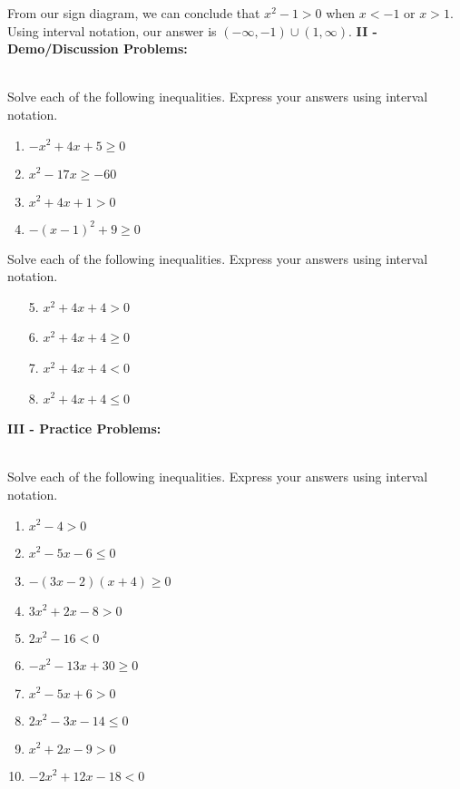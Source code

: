 \documentclass[12pt]{article}
\theoremstyle{definition}
\begin{document}
\begin{center}
\end{center} 
From our sign diagram, we can conclude that $x^2-1>0$ when $x<-1$ or $x>1$.  Using interval notation, our answer is $(-\infty,-1)\cup(1,\infty)$.\newpage
{\bf II - Demo/Discussion Problems:}\\
\ \par
Solve each of the following inequalities.  Express your answers using interval notation.
\begin{enumerate}
	\item $-x^2+4x+5\geq 0$
	\item $x^2-17x\geq -60$
	\item $x^2+4x+1>0$
	\item $-(x-1)^2+9\geq 0$
\end{enumerate}
Solve each of the following inequalities.  Express your answers using interval notation.
\begin{enumerate}
	\item[5.] $x^2+4x+4>0$
	\item[6.] $x^2+4x+4\geq 0$
	\item[7.] $x^2+4x+4<0$
	\item[8.] $x^2+4x+4\leq 0$
\end{enumerate}
{\bf III - Practice Problems:}\\
\ \par
Solve each of the following inequalities.  Express your answers using interval notation.
\begin{multicols}{2}
\begin{enumerate}
	\item $x^2-4>0$
	\item $x^2-5x-6\leq 0$
	\item $-(3x-2)(x+4)\geq 0$
	\item $3x^2+2x-8>0$
	\item $2x^2-16<0$
	\item $-x^2-13x+30\geq 0$
	\item $x^2-5x+6>0$
	\item $2x^2-3x-14\leq 0$
	\item $x^2+2x-9>0$
	\item $-2x^2+12x-18<0$
\end{enumerate}
\end{multicols}
\newpage
\ \newpage
\end{document}
